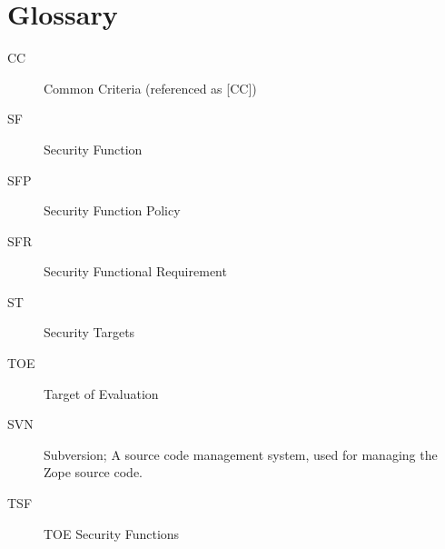\documentclass[12pt,english]{scrbook}
\begin{document}



\chapter{Glossary}

\begin{description}

  \item[CC] Common Criteria (referenced as {[}CC])
  \item[SF] Security Function
  \item[SFP] Security Function Policy
  \item[SFR] Security Functional Requirement
  \item[ST] Security Targets
  \item[TOE] Target of Evaluation
  \item[SVN] Subversion; A source code management system, used for managing the Zope source code.
  \item[TSF] TOE Security Functions

\end{description} 

\end{document}
